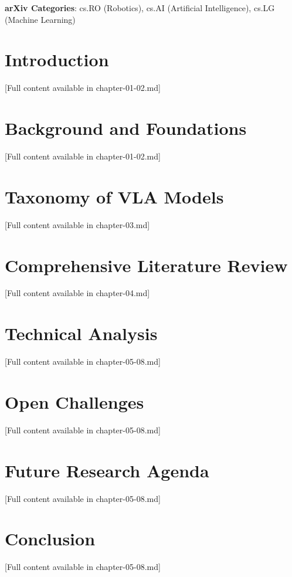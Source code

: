 \documentclass[10pt,twocolumn]{article}
\begin{document}
\begin{flushleft}
\textbf{arXiv Categories}: cs.RO (Robotics), cs.AI (Artificial Intelligence), cs.LG (Machine Learning)
\end{flushleft}

\newpage
\tableofcontents
\newpage

\section{Introduction}
[Full content available in chapter-01-02.md]

\section{Background and Foundations}
[Full content available in chapter-01-02.md]

\section{Taxonomy of VLA Models}
[Full content available in chapter-03.md]

\section{Comprehensive Literature Review}
[Full content available in chapter-04.md]

\section{Technical Analysis}
[Full content available in chapter-05-08.md]

\section{Open Challenges}
[Full content available in chapter-05-08.md]

\section{Future Research Agenda}
[Full content available in chapter-05-08.md]

\section{Conclusion}
[Full content available in chapter-05-08.md]
\end{document}
